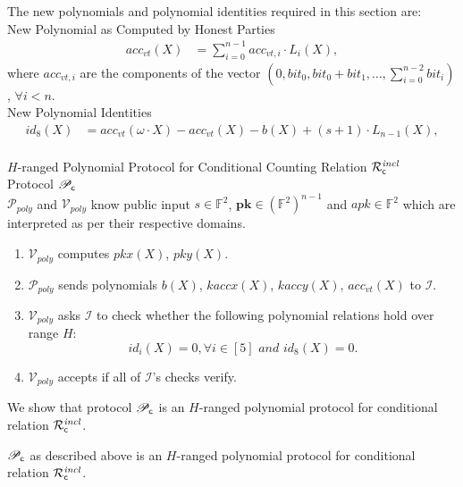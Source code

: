 \noindent The new polynomials and polynomial identities required in this section are: \\

\noindent \textsf{New Polynomial as Computed by Honest Parties} 
\begin{align*}
acc_{vt}(X) & = \sum_{i=0}^{n-1} acc_{vt,i} \cdot L_i(X),
\end{align*}
where $acc_{vt,i}$ are the components of the vector $(0, \mathit{bit_0}, \mathit{bit_0} + \mathit{bit_1}, \ldots, \sum_{i=0}^{n-2}\mathit{bit_i})$, $\forall i < n$. \\

\noindent \textsf{New Polynomial Identities} 
\begin{align*}
id_8(X) & = acc_{vt}(\omega \cdot X) - acc_{vt}(X) - b(X) + (s+1) \cdot L_{n-1}(X),   \\
\end{align*}

\noindent \textsf{{$H$-ranged Polynomial Protocol for Conditional Counting Relation $\mathcal{R}^{\mathit{incl}}_{\mathsf{c}}$}} \\

\noindent \textsf{Protocol $\mathscr{P}_{\mathsf{c}}$} \\

\noindent $\mathcal{P}_{poly}$ and $\mathcal{V}_{poly}$ know public input $s \in \mathbb{F}^2$, 
$\mathbf{pk} \in (\mathbb{F}^2)^{n-1}$ and $\mathit{apk} \in \mathbb{F}^2$ which are interpreted as per their respective domains. 

\begin{enumerate}
\item $\mathcal{V}_{poly}$ computes $pkx(X)$, $pky(X)$.
\item $\mathcal{P}_{poly}$ sends polynomials $b(X)$, $kaccx(X)$, $kaccy(X)$, $acc_{vt}(X)$ to $\mathcal{I}$. 
\item $\mathcal{V}_{poly}$ asks $\mathcal{I}$ to check whether the following polynomial relations hold over range $H$:
$$id_i(X) = 0, \forall i \in [5] \textit{ and } id_8(X) = 0.$$ 
\item $\mathcal{V}_{poly}$ accepts if all of $\mathcal{I}$'s checks verify. 
\end{enumerate}

\noindent We show that protocol $\mathscr{P}_{\mathsf{c}}$ is an $H$-ranged polynomial protocol for conditional relation 
$\mathcal{R}^{\mathit{incl}}_{\mathsf{c}}$. 

\begin{lemma} $\mathscr{P}_{\mathsf{c}}$ as described above is an $H$-ranged polynomial protocol for conditional relation $\mathcal{R}^{\mathit{incl}}_{\mathsf{c}}$.
\end{lemma}

